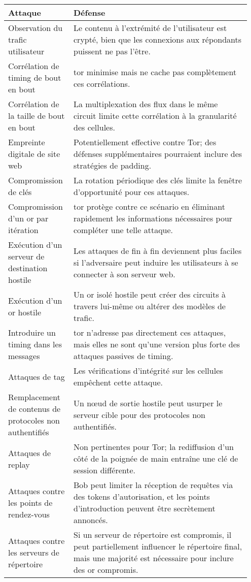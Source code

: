\begin{longtable}{p{0.25\linewidth} p{0.7\linewidth}}
    \toprule
    \textbf{Attaque} & \textbf{Défense} \\
    \midrule
    Observation du trafic utilisateur & Le contenu à l'extrémité de l'utilisateur est crypté, bien que les connexions aux répondants puissent ne pas l'être. \\
    \addlinespace
    Corrélation de timing de bout en bout & \acrshort{tor} minimise mais ne cache pas complètement ces corrélations. \\
    \addlinespace
    Corrélation de la taille de bout en bout & La multiplexation des flux dans le même circuit limite cette corrélation à la granularité des cellules. \\
    \addlinespace
    Empreinte digitale de site web & Potentiellement effective contre Tor; des défenses supplémentaires pourraient inclure des stratégies de padding. \\
    \addlinespace
    Compromission de clés & La rotation périodique des clés limite la fenêtre d'opportunité pour ces attaques. \\
    \addlinespace
    Compromission d'un \acrshort{or} par itération & \acrshort{tor} protège contre ce scénario en éliminant rapidement les informations nécessaires pour compléter une telle attaque. \\
    \addlinespace
    Exécution d'un serveur de destination hostile & Les attaques de fin à fin deviennent plus faciles si l'adversaire peut induire les utilisateurs à se connecter à son serveur web. \\
    \addlinespace
    Exécution d'un \acrshort{or} hostile & Un \acrshort{or} isolé hostile peut créer des circuits à travers lui-même ou altérer des modèles de trafic. \\
    \addlinespace
    Introduire un timing dans les messages & \acrshort{tor} n'adresse pas directement ces attaques, mais elles ne sont qu'une version plus forte des attaques passives de timing. \\
    \addlinespace
    Attaques de tag & Les vérifications d'intégrité sur les cellules empêchent cette attaque. \\
    \addlinespace
    Remplacement de contenus de protocoles non authentifiés & Un nœud de sortie hostile peut usurper le serveur cible pour des protocoles non authentifiés. \\
    \addlinespace
    Attaques de replay & Non pertinentes pour Tor; la rediffusion d'un côté de la poignée de main entraîne une clé de session différente. \\
    \addlinespace
    Attaques contre les points de rendez-vous & Bob peut limiter la réception de requêtes via des tokens d'autorisation, et les points d'introduction peuvent être secrètement annoncés. \\
    \addlinespace
    Attaques contre les serveurs de répertoire & Si un serveur de répertoire est compromis, il peut partiellement influencer le répertoire final, mais une majorité est nécessaire pour inclure des \acrshort{or} compromis. \\
    \bottomrule
    \end{longtable}